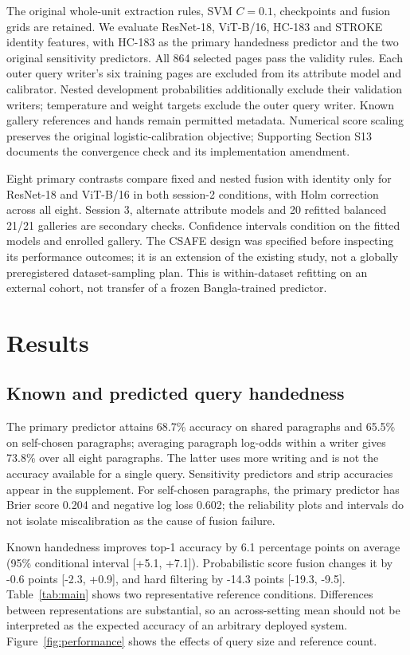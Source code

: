 The original whole-unit extraction rules, SVM $C=0.1$, checkpoints and fusion grids are retained. We evaluate ResNet-18, ViT-B/16, HC-183 and STROKE identity features, with HC-183 as the primary handedness predictor and the two original sensitivity predictors. All 864 selected pages pass the validity rules. Each outer query writer's six training pages are excluded from its attribute model and calibrator. Nested development probabilities additionally exclude their validation writers; temperature and weight targets exclude the outer query writer. Known gallery references and hands remain permitted metadata. Numerical score scaling preserves the original logistic-calibration objective; Supporting Section S13 documents the convergence check and its implementation amendment.

Eight primary contrasts compare fixed and nested fusion with identity only for ResNet-18 and ViT-B/16 in both session-2 conditions, with Holm correction across all eight. Session 3, alternate attribute models and 20 refitted balanced 21/21 galleries are secondary checks. Confidence intervals condition on the fitted models and enrolled gallery. The CSAFE design was specified before inspecting its performance outcomes; it is an extension of the existing study, not a globally preregistered dataset-sampling plan. This is within-dataset refitting on an external cohort, not transfer of a frozen Bangla-trained predictor.

\section{Results}
\subsection{Known and predicted query handedness}
The primary predictor attains 68.7\% accuracy on shared paragraphs and 65.5\% on self-chosen paragraphs; averaging paragraph log-odds within a writer gives 73.8\% over all eight paragraphs. The latter uses more writing and is not the accuracy available for a single query. Sensitivity predictors and strip accuracies appear in the supplement. For self-chosen paragraphs, the primary predictor has Brier score 0.204 and negative log loss 0.602; the reliability plots and intervals do not isolate miscalibration as the cause of fusion failure.

Known handedness improves top-1 accuracy by 6.1 percentage points on average (95\% conditional interval [+5.1, +7.1]). Probabilistic score fusion changes it by -0.6 points [-2.3, +0.9], and hard filtering by -14.3 points [-19.3, -9.5]. Table~\ref{tab:main} shows two representative reference conditions. Differences between representations are substantial, so an across-setting mean should not be interpreted as the expected accuracy of an arbitrary deployed system. Figure~\ref{fig:performance} shows the effects of query size and reference count.

